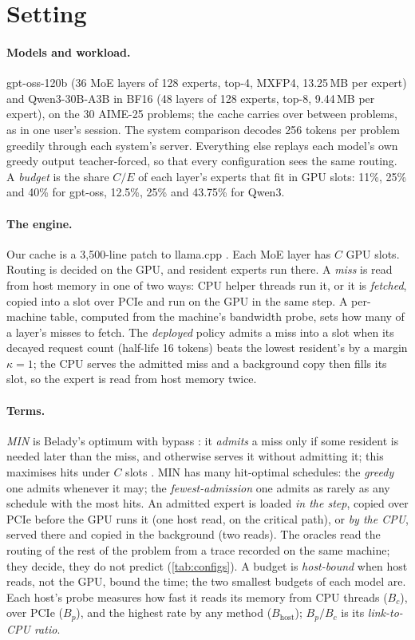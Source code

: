 \section{Setting}\label{sec:setting}
\paragraph{Models and workload.} gpt-oss-120b (36 MoE layers of 128 experts, top-4, MXFP4, 13.25\,MB per expert) and
Qwen3-30B-A3B in BF16 (48 layers of 128 experts, top-8, 9.44\,MB per expert), on the 30 AIME-25 problems; the cache
carries over between problems, as in one user's session. The system comparison decodes 256 tokens per problem
greedily through each system's server. Everything else replays each model's own greedy output teacher-forced, so that
every configuration sees the same routing. A \emph{budget} is the share $C/E$ of each layer's experts that fit in GPU
slots: 11\%, 25\% and 40\% for gpt-oss, 12.5\%, 25\% and 43.75\% for Qwen3.

\paragraph{The engine.} Our cache is a 3{,}500-line patch to llama.cpp \citep{llamacpp}. Each MoE layer has $C$ GPU
slots. Routing is decided on the GPU, and resident experts run there. A \emph{miss} is read from host memory in one of
two ways: CPU helper threads run it, or it is \emph{fetched}, copied into a slot over PCIe and run on the GPU in the same
step. A per-machine table, computed from the machine's bandwidth probe, sets how many of a layer's misses to fetch. The
\emph{deployed} policy admits a miss into a slot when its decayed request count (half-life 16 tokens) beats the lowest
resident's by a margin $\kappa{=}1$; the CPU serves the admitted miss and a background copy then fills its slot, so the
expert is read from host memory twice.

\paragraph{Terms.} \emph{MIN} is Belady's optimum with bypass \citep{belady1966study,bypassopt}: it \emph{admits} a
miss only if some resident is needed later than the miss, and otherwise serves it without admitting it; this maximises
hits under $C$ slots \citep{carlisle1995kcoloring,jain2016hawkeye}. MIN has many hit-optimal schedules: the
\emph{greedy} one admits whenever it may; the \emph{fewest-admission} one admits as rarely as any schedule with the
most hits. An admitted expert is loaded \emph{in the step}, copied over PCIe before the GPU runs it (one host read, on
the critical path), or \emph{by the CPU}, served there and copied in the background (two reads). The oracles read the
routing of the rest of the problem from a trace recorded on the same machine; they decide, they do not predict
(\cref{tab:configs}). A budget is \emph{host-bound} when host reads, not the GPU, bound the time; the two smallest
budgets of each model are. Each host's probe measures how fast it reads its memory from CPU threads ($B_c$), over PCIe
($B_p$), and the highest rate by any method ($B_{\mathrm{host}}$); $B_p/B_c$ is its \emph{link-to-CPU ratio}.

